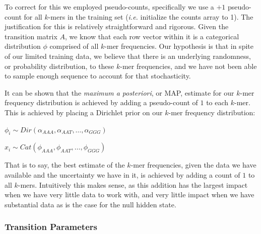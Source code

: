 To correct for this we employed pseudo-counts, specifically we use a $+1$ pseudo-count for all $k$-mers in the training set (\emph{i.e.} initialize the counts array to 1). The justification for this is relatively straightforward and rigorous. Given the transition matrix $A$, we know that each row vector within it is a categorical distribution $\phi$ comprised of all $k$-mer frequencies. Our hypothesis is that in spite of our limited training data, we believe that there is an underlying randomness, or probability distribution, to these $k$-mer frequencies, and we have not been able to sample enough sequence to account for that stochasticity. 

It can be shown that the \emph{maximum a posteriori}, or MAP, estimate for our $k$-mer frequency distribution is achieved by adding a pseudo-count of $1$ to each $k$-mer. This is achieved by placing a Dirichlet prior on our $k$-mer frequency distribution:

\begin{center}
    $\phi_i \sim Dir(\alpha_{AAA},\alpha_{AAT},\dots,\alpha_{GGG})$
    
    $x_i \sim Cat(\phi_{AAA},\phi_{AAT},\dots,\phi_{GGG})$
\end{center}

That is to say, the best estimate of the $k$-mer frequencies, given the data we have available and the uncertainty we have in it, is achieved by adding a count of $1$ to all $k$-mers. Intuitively this makes sense, as this addition has the largest impact when we have very little data to work with, and very little impact when we have substantial data as is the case for the null hidden state.

\subsubsection{Transition Parameters}

